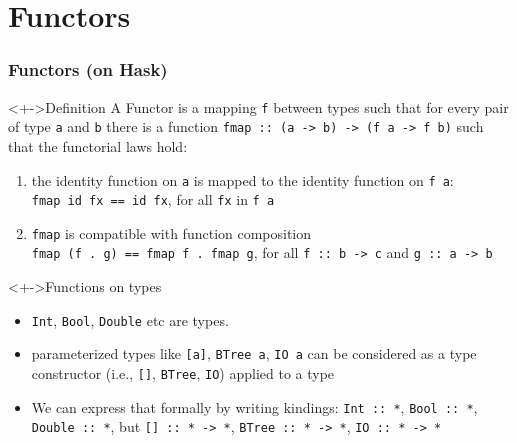 \documentclass{beamer}
\begin{document}
\section{Functors}
\begin{frame}[fragile]
  \frametitle{Functors (on Hask)}
  \begin{block}<+->{Definition}
    A \alert{Functor} is a mapping \lstinline{f} between types such that for
    every pair of type \lstinline{a} and \lstinline|b| there is a
    function 
    \lstinline|fmap :: (a -> b) -> (f a -> f b)|
    such that the \alert{functorial laws} hold:
    \begin{enumerate}
    \item the identity function on \lstinline|a| is mapped to the
      identity function on \lstinline|f a|:\\
      \lstinline|fmap id fx == id fx|, \quad for all \lstinline|fx| in
      \lstinline|f a|
    \item \lstinline|fmap| is compatible with function composition\\
      \lstinline|fmap (f . g) == fmap f . fmap g|, \quad for all
      \lstinline|f :: b -> c| and \lstinline|g :: a -> b|
    \end{enumerate}
  \end{block}
  \begin{alertblock}<+->{Functions on types}
    \begin{itemize}
    \item \lstinline{Int}, \lstinline{Bool}, \lstinline{Double} etc
      are types.
    \item parameterized types like \lstinline$[a]$,
      \lstinline$BTree a$, \lstinline$IO a$ can be considered as a
      type constructor (i.e., \lstinline$[]$, \lstinline$BTree$,
      \lstinline$IO$) applied to a type 
    \item We can express that formally by writing \alert{kindings}:
      \lstinline{Int :: *},
      \lstinline{Bool :: *},
      \lstinline{Double :: *}, but
      \lstinline{[] :: * -> *},
      \lstinline{BTree :: * -> *},
      \lstinline{IO :: * -> *}
    \end{itemize}
  \end{alertblock}
\end{frame}
\end{document}
